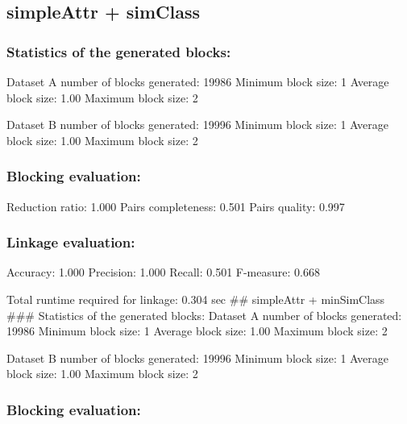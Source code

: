 \documentclass[
  letterpaper,
  DIV=11,
  numbers=noendperiod]{scrartcl}
\author{}
\date{}
\begin{document}
\ifdefined\Shaded\renewenvironment{Shaded}{\begin{tcolorbox}[borderline west={3pt}{0pt}{shadecolor}, breakable, sharp corners, interior hidden, enhanced, frame hidden, boxrule=0pt]}{\end{tcolorbox}}\fi

\hypertarget{simpleattr-simclass}{%
\subsection{simpleAttr + simClass}\label{simpleattr-simclass}}

\hypertarget{statistics-of-the-generated-blocks}{%
\subsubsection{Statistics of the generated
blocks:}\label{statistics-of-the-generated-blocks}}

Dataset A number of blocks generated: 19986 Minimum block size: 1
Average block size: 1.00 Maximum block size: 2

Dataset B number of blocks generated: 19996 Minimum block size: 1
Average block size: 1.00 Maximum block size: 2

\hypertarget{blocking-evaluation}{%
\subsubsection{Blocking evaluation:}\label{blocking-evaluation}}

Reduction ratio: 1.000 Pairs completeness: 0.501 Pairs quality: 0.997

\hypertarget{linkage-evaluation}{%
\subsubsection{Linkage evaluation:}\label{linkage-evaluation}}

Accuracy: 1.000 Precision: 1.000 Recall: 0.501 F-measure: 0.668

Total runtime required for linkage: 0.304 sec \#\# simpleAttr +
minSimClass \#\#\# Statistics of the generated blocks: Dataset A number
of blocks generated: 19986 Minimum block size: 1 Average block size:
1.00 Maximum block size: 2

Dataset B number of blocks generated: 19996 Minimum block size: 1
Average block size: 1.00 Maximum block size: 2

\hypertarget{blocking-evaluation-1}{%
\subsubsection{Blocking evaluation:}\label{blocking-evaluation-1}}
\end{document}
